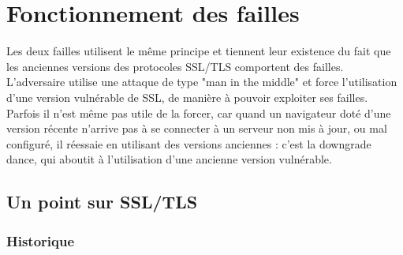 \section{Fonctionnement des failles}


Les deux failles utilisent le m\^eme principe et tiennent leur existence du fait que les anciennes versions des protocoles SSL/TLS comportent des failles. L'adversaire utilise une attaque de type "man in the middle" et force l'utilisation d'une version vulnérable de SSL, de manière à pouvoir exploiter ses failles. Parfois il n'est m\^eme pas utile de la forcer, car quand un navigateur doté d’une version récente n’arrive pas à se connecter à un serveur non mis à jour, ou mal configuré, il réessaie en utilisant des versions anciennes : c’est la downgrade dance, qui aboutit à l'utilisation d'une ancienne version vulnérable.

\subsection{Un point sur SSL/TLS}

\subsubsection{Historique}

